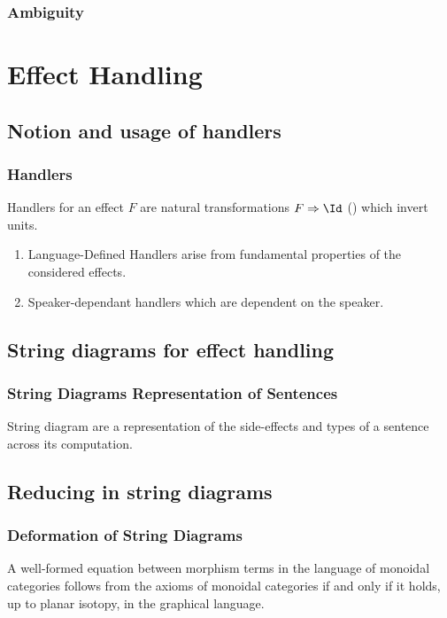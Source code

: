 \documentclass[math, english, info]{beamercours}
\begin{document}
\begin{frame}
	\frametitle{Ambiguity}
	\resizebox{\textwidth}{!}{}
\end{frame}

\section{Effect Handling}
\subsection{Notion and usage of handlers}
\begin{frame}
	\frametitle{Handlers}
	Handlers for an effect $F$ are natural transformations $F \Rightarrow \Id$ (\cite{wuEffectHandlersScope2014}) which invert units.

	\smallskip\pause

	\begin{enumerate}
		\item Language-Defined Handlers arise from fundamental properties of the considered effects.
		      \pause
		\item Speaker-dependant handlers which are dependent on the speaker.
	\end{enumerate}
\end{frame}

\subsection{String diagrams for effect handling}
\begin{frame}
	\frametitle{String Diagrams Representation of Sentences}
	String diagram are a representation of the side-effects and types of a
	sentence across its computation.
	\begin{center}
	\end{center}

\end{frame}

\subsection{Reducing in string diagrams}
\begin{frame}
	\frametitle{Deformation of String Diagrams}
	\begin{thm}
		\label{thm:isotopy}
		A well-formed equation between morphism terms in the language of monoidal
		categories follows from the axioms of monoidal categories if and only if it
		holds, up to planar isotopy, in the graphical language.
	\end{thm}
\end{frame}
\end{document}
